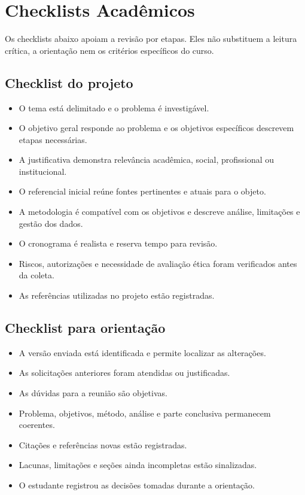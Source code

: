 \chapter{Checklists Acadêmicos}

Os checklists abaixo apoiam a revisão por etapas. Eles não substituem a leitura crítica, a orientação nem os critérios específicos do curso.

\section{Checklist do projeto}

\begin{itemize}
  \item O tema está delimitado e o problema é investigável.
  \item O objetivo geral responde ao problema e os objetivos específicos descrevem etapas necessárias.
  \item A justificativa demonstra relevância acadêmica, social, profissional ou institucional.
  \item O referencial inicial reúne fontes pertinentes e atuais para o objeto.
  \item A metodologia é compatível com os objetivos e descreve análise, limitações e gestão dos dados.
  \item O cronograma é realista e reserva tempo para revisão.
  \item Riscos, autorizações e necessidade de avaliação ética foram verificados antes da coleta.
  \item As referências utilizadas no projeto estão registradas.
\end{itemize}

\section{Checklist para orientação}

\begin{itemize}
  \item A versão enviada está identificada e permite localizar as alterações.
  \item As solicitações anteriores foram atendidas ou justificadas.
  \item As dúvidas para a reunião são objetivas.
  \item Problema, objetivos, método, análise e parte conclusiva permanecem coerentes.
  \item Citações e referências novas estão registradas.
  \item Lacunas, limitações e seções ainda incompletas estão sinalizadas.
  \item O estudante registrou as decisões tomadas durante a orientação.
\end{itemize}


